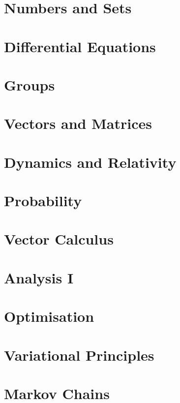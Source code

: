 \documentclass{book}
\begin{document}
\let\maketitle\ignorespaces{}
\renewcommand{\tableofcontentsnewpage}{\minitoc\newpage}

\chapter{Numbers and Sets}

\chapter{Differential Equations}

\chapter{Groups}

\chapter{Vectors and Matrices}

\chapter{Dynamics and Relativity}

\chapter{Probability}

\chapter{Vector Calculus}

\chapter{Analysis I}


\chapter{Optimisation}

\chapter{Variational Principles}

\chapter{Markov Chains}

\end{document}
